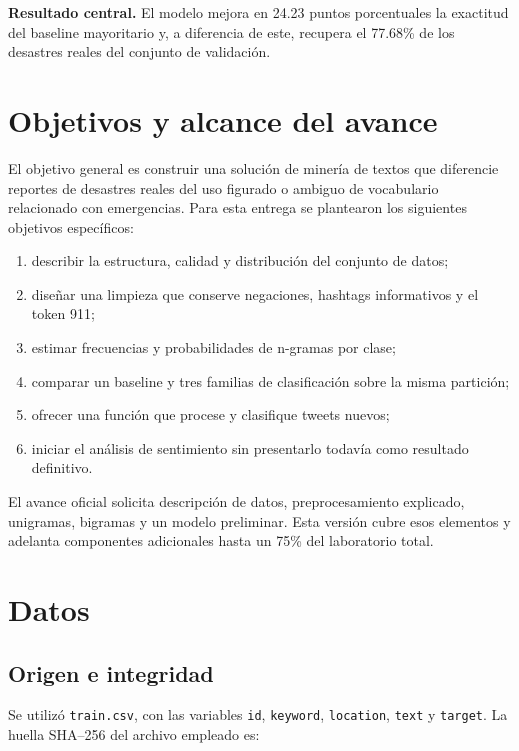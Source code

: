 \documentclass[11pt,letterpaper]{article}
\newcommand{\resultbox}[1]{\colorbox{soft}{\parbox{0.94\linewidth}{#1}}}
\begin{document}
\resultbox{\textbf{Resultado central.} El modelo mejora en 24.23 puntos porcentuales la exactitud del baseline mayoritario y, a diferencia de este, recupera el 77.68\% de los desastres reales del conjunto de validación.}

\section{Objetivos y alcance del avance}

El objetivo general es construir una solución de minería de textos que diferencie reportes de desastres reales del uso figurado o ambiguo de vocabulario relacionado con emergencias. Para esta entrega se plantearon los siguientes objetivos específicos:

\begin{enumerate}
  \item describir la estructura, calidad y distribución del conjunto de datos;
  \item diseñar una limpieza que conserve negaciones, hashtags informativos y el token 911;
  \item estimar frecuencias y probabilidades de n-gramas por clase;
  \item comparar un baseline y tres familias de clasificación sobre la misma partición;
  \item ofrecer una función que procese y clasifique tweets nuevos;
  \item iniciar el análisis de sentimiento sin presentarlo todavía como resultado definitivo.
\end{enumerate}

El avance oficial solicita descripción de datos, preprocesamiento explicado, unigramas, bigramas y un modelo preliminar. Esta versión cubre esos elementos y adelanta componentes adicionales hasta un 75\% del laboratorio total.

\section{Datos}

\subsection{Origen e integridad}

Se utilizó \texttt{train.csv}, con las variables \texttt{id}, \texttt{keyword}, \texttt{location}, \texttt{text} y \texttt{target}. La huella SHA--256 del archivo empleado es:
\end{document}
